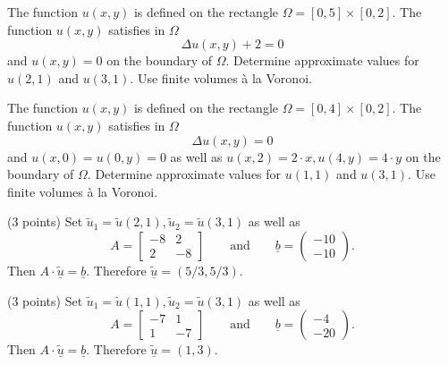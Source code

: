 \begin{teilaufgaben}
\item
The function $u(x,y)$ is defined on the rectangle $\Omega = [0,5] \times [0,2].$
The function $u(x,y)$ satisfies in $\Omega$ 
\[
\Delta u(x,y) + 2 = 0
\]
and $u(x,y) = 0$ on the boundary of $\Omega$.
Determine approximate values for $u(2,1)$ and $u(3,1)$. 
Use finite volumes \`a la Voronoi.  
\item
The function $u(x,y)$ is defined on the rectangle $\Omega = [0,4] \times [0,2].$
The function $u(x,y)$ satisfies in $\Omega$ 
\[
\Delta u(x,y) = 0
\]
and $u(x,0) = u(0,y) = 0$ as well as $u(x,2) = 2 \cdot x, u(4,y) = 4 \cdot y$  on the boundary of $\Omega$.
Determine approximate values for $u(1,1)$ and $u(3,1)$. 
Use finite volumes \`a la Voronoi.  
\end{teilaufgaben}

\begin{loesung}
\begin{teilaufgaben}
\item
(3 points) Set $\tilde u_1 = \tilde u(2,1), \tilde u_2 = \tilde u(3,1)$ as well as
\[
A = \left[\begin{array}{rr} -8 & 2  \\ 2 & -8  \end{array}\right]
\qquad\text{and}\qquad
\underline{b} =  \left(\begin{array}{r} -10 \\ -10 \end{array}\right).
\]
Then $A \cdot \underline{\tilde u} = \underline{b}$.
Therefore $\underline{\tilde u} = (5/3,5/3)$.
\item
(3 points) Set $\tilde u_1 = \tilde u(1,1), \tilde u_2 = \tilde u(3,1)$ as well as
\[
A = \left[\begin{array}{rr} -7 & 1  \\ 1 & -7  \end{array}\right]
\qquad\text{and}\qquad
\underline{b} = \left(\begin{array}{r} -4 \\ -20 \end{array}\right).
\]
Then  $A \cdot \underline{\tilde u} = \underline{b}$.
Therefore $\underline{\tilde u} = (1,3)$.
\qedhere
\end{teilaufgaben}
\end{loesung}

